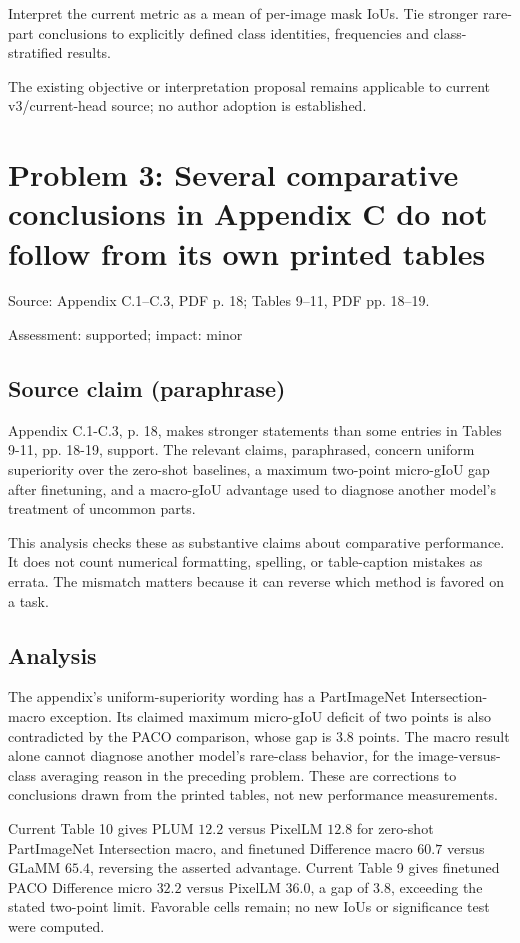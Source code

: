 \documentclass[11pt]{article}
\begin{document}
Interpret the current metric as a mean of per-image mask IoUs. Tie stronger rare-part conclusions to explicitly defined class identities, frequencies and class-stratified results.

The existing objective or interpretation proposal remains applicable to current v3/current-head source; no author adoption is established.

\section*{Problem 3: Several comparative conclusions in Appendix C do not follow from its own printed tables}

Source: Appendix C.1–C.3, PDF p. 18; Tables 9–11, PDF pp. 18–19.

Assessment: supported; impact: minor

\subsection*{Source claim (paraphrase)}

Appendix C.1-C.3, p. 18, makes stronger statements than some entries in Tables 9-11, pp. 18-19, support. The relevant claims, paraphrased, concern uniform superiority over the zero-shot baselines, a maximum two-point micro-gIoU gap after finetuning, and a macro-gIoU advantage used to diagnose another model’s treatment of uncommon parts.

This analysis checks these as substantive claims about comparative performance. It does not count numerical formatting, spelling, or table-caption mistakes as errata. The mismatch matters because it can reverse which method is favored on a task.

\subsection*{Analysis}

The appendix's uniform-superiority wording has a PartImageNet Intersection-macro exception. Its claimed maximum micro-gIoU deficit of two points is also contradicted by the PACO comparison, whose gap is \(3.8\) points. The macro result alone cannot diagnose another model's rare-class behavior, for the image-versus-class averaging reason in the preceding problem. These are corrections to conclusions drawn from the printed tables, not new performance measurements.

Current Table 10 gives PLUM \(12.2\) versus PixelLM \(12.8\) for zero-shot PartImageNet Intersection macro, and finetuned Difference macro \(60.7\) versus GLaMM \(65.4\), reversing the asserted advantage. Current Table 9 gives finetuned PACO Difference micro \(32.2\) versus PixelLM \(36.0\), a gap of \(3.8\), exceeding the stated two-point limit. Favorable cells remain; no new IoUs or significance test were computed.
\end{document}
